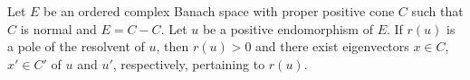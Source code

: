 Let $E$ be an ordered complex Banach space with proper positive cone $C$ such that $C$ is normal and $E = C - C$. Let $u$ be a positive endomorphism of $E$. If $r(u)$ is a pole of the resolvent of $u$, then $r(u) > 0$ and there exist eigenvectors $x \in C$, $x' \in C'$ of $u$ and $u'$, respectively, pertaining to $r(u)$.
